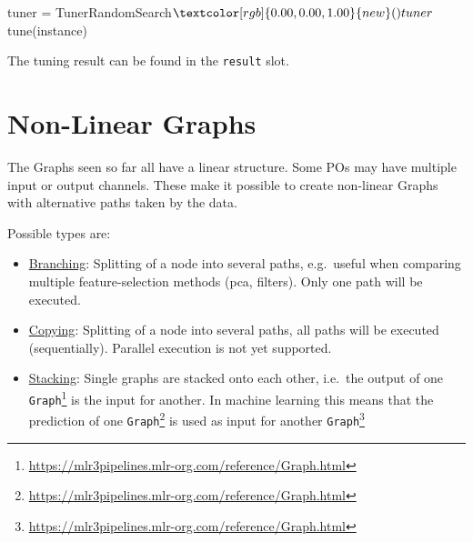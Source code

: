 \documentclass[12pt,]{scrbook}
\newenvironment{Shaded}{}{}
\newcommand{\KeywordTok}[1]{\textcolor[rgb]{0.00,0.00,1.00}{#1}}
\newcommand{\NormalTok}[1]{#1}
\newcommand{\OperatorTok}[1]{#1}
\newcommand{\StringTok}[1]{\textcolor[rgb]{0.00,0.50,0.50}{#1}}
\providecommand{\tightlist}{%
  \setlength{\itemsep}{0pt}\setlength{\parskip}{0pt}}
\renewcommand{\href}[2]{#2\footnote{\url{#1}}}
\begin{document}
\begin{Shaded}
\begin{Highlighting}[]
\NormalTok{tuner =}\StringTok{ }\NormalTok{TunerRandomSearch}\OperatorTok{$}\KeywordTok{new}\NormalTok{()}
\NormalTok{tuner}\OperatorTok{$}\KeywordTok{tune}\NormalTok{(instance)}
\end{Highlighting}
\end{Shaded}

The tuning result can be found in the \texttt{result} slot.

\begin{Shaded}
\end{Shaded}

\hypertarget{pipe-nonlinear}{%
\section{Non-Linear Graphs}\label{pipe-nonlinear}}

The Graphs seen so far all have a linear structure.
Some POs may have multiple input or output channels.
These make it possible to create non-linear Graphs with alternative paths taken by the data.

Possible types are:

\begin{itemize}
\tightlist
\item
  \protect\hyperlink{pipe-model-ensembles-branching}{Branching}:
  Splitting of a node into several paths, e.g.~useful when comparing multiple feature-selection methods (pca, filters).
  Only one path will be executed.
\item
  \protect\hyperlink{pipe-model-ensembles-copying}{Copying}:
  Splitting of a node into several paths, all paths will be executed (sequentially).
  Parallel execution is not yet supported.
\item
  \protect\hyperlink{pipe-model-ensembles-stacking}{Stacking}:
  Single graphs are stacked onto each other, i.e.~the output of one \href{https://mlr3pipelines.mlr-org.com/reference/Graph.html}{\texttt{Graph}} is the input for another.
  In machine learning this means that the prediction of one \href{https://mlr3pipelines.mlr-org.com/reference/Graph.html}{\texttt{Graph}} is used as input for another \href{https://mlr3pipelines.mlr-org.com/reference/Graph.html}{\texttt{Graph}}
\end{itemize}
\end{document}
